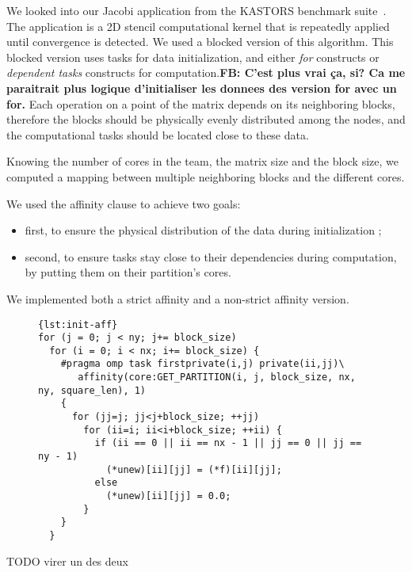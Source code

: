 \documentclass{Styles/llncs}
\newcommand{\FB}[1]{{\color{orange}\bfseries FB: #1}}
\begin{document}
We looked into our Jacobi application from the KASTORS benchmark suite~\cite{virouleau:hal-01081974}.
The application is a 2D stencil computational kernel that is repeatedly applied until
convergence is detected. We used a blocked version of this algorithm.
This blocked version uses tasks for data initialization, and either \emph{for} constructs or
\emph{dependent tasks} constructs for computation.\FB{C'est plus vrai ça, si? Ca me paraitrait plus logique d'initialiser les donnees des version for avec un for.} 
Each operation on a point of the matrix depends on its neighboring blocks,
therefore the blocks should be physically evenly distributed among the nodes,
and the computational tasks should be located close to these data.

Knowing the number of cores in the team, the matrix size and the block size, we computed a mapping
between multiple neighboring blocks and the different cores.

We used the affinity clause to achieve two goals:
\begin{itemize}
    \item first, to ensure the physical distribution of the data during initialization ;
    \item second, to ensure tasks stay close to their dependencies during computation, by putting them on their partition's cores.
\end{itemize}

We implemented both a strict affinity and a non-strict affinity version.


\begin{figure}[htbp]
\begin{lstlisting}[caption=Example of use of the affinity clause for initialization,frame=tlrb,style=smaller,label=lst:init-aff]{lst:init-aff}
for (j = 0; j < ny; j+= block_size)
  for (i = 0; i < nx; i+= block_size) {
    #pragma omp task firstprivate(i,j) private(ii,jj)\
       affinity(core:GET_PARTITION(i, j, block_size, nx, ny, square_len), 1)
    {
      for (jj=j; jj<j+block_size; ++jj)
        for (ii=i; ii<i+block_size; ++ii) {
          if (ii == 0 || ii == nx - 1 || jj == 0 || jj == ny - 1)
            (*unew)[ii][jj] = (*f)[ii][jj];
          else
            (*unew)[ii][jj] = 0.0;
        }
    }
  }
\end{lstlisting}
\end{figure}

TODO virer un des deux
\end{document}
